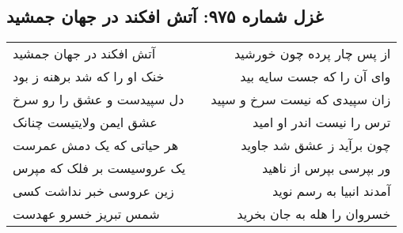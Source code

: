 \begin{center}
\section*{غزل شماره ۹۷۵: آتش افکند در جهان جمشید}
\label{sec:0975}
\begin{longtable}{l p{0.5cm} r}
آتش افکند در جهان جمشید
&&
از پس چار پرده چون خورشید
\\
خنک او را که شد برهنه ز بود
&&
وای آن را که جست سایه بید
\\
دل سپیدست و عشق را رو سرخ
&&
زان سپیدی که نیست سرخ و سپید
\\
عشق ایمن ولایتیست چنانک
&&
ترس را نیست اندر او امید
\\
هر حیاتی که یک دمش عمرست
&&
چون برآید ز عشق شد جاوید
\\
یک عروسیست بر فلک که مپرس
&&
ور بپرسی بپرس از ناهید
\\
زین عروسی خبر نداشت کسی
&&
آمدند انبیا به رسم نوید
\\
شمس تبریز خسرو عهدست
&&
خسروان را هله به جان بخرید
\\
\end{longtable}
\end{center}
